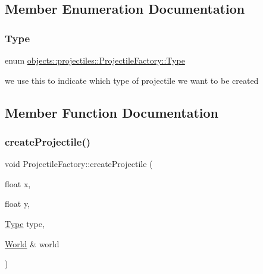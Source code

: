 \subsection{Member Enumeration Documentation}
\mbox{\label{classobjects_1_1projectiles_1_1ProjectileFactory_abc75eceeed2dbadc736fb93fd6046698}}
\subsubsection{\texorpdfstring{Type}{Type}}
{\footnotesize\ttfamily enum \hyperlink{classobjects_1_1projectiles_1_1ProjectileFactory_abc75eceeed2dbadc736fb93fd6046698}{objects\+::projectiles\+::\+Projectile\+Factory\+::\+Type}}

we use this to indicate which type of projectile we want to be created 

\subsection{Member Function Documentation}
\mbox{\label{classobjects_1_1projectiles_1_1ProjectileFactory_ae2fdae24114f0a54e474e1cf14eb34d5}}
\subsubsection{\texorpdfstring{create\+Projectile()}{createProjectile()}}
{\footnotesize\ttfamily void Projectile\+Factory\+::create\+Projectile (\begin{DoxyParamCaption}\item[{float}]{x,  }\item[{float}]{y,  }\item[{\hyperlink{classobjects_1_1projectiles_1_1ProjectileFactory_abc75eceeed2dbadc736fb93fd6046698}{Type}}]{type,  }\item[{\hyperlink{classWorld}{World} \&}]{world }\end{DoxyParamCaption})\hspace{0.3cm}{\ttfamily [static]}}

